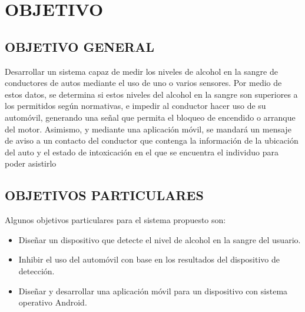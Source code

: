 \section{OBJETIVO}
\subsection{OBJETIVO GENERAL}
Desarrollar un sistema capaz de medir los niveles de alcohol en la sangre de conductores de autos mediante el uso de uno o varios sensores. Por medio de estos datos, se determina si estos niveles del alcohol en la sangre son superiores a los permitidos según normativas, e impedir al conductor hacer uso de su automóvil, generando una señal que permita el bloqueo de encendido o arranque del motor. Asimismo,  y mediante una aplicación móvil, se mandará un mensaje de aviso a un contacto del conductor que contenga la información de la ubicación del auto y el estado de intoxicación en el que se encuentra el individuo para poder asistirlo
\subsection{OBJETIVOS PARTICULARES}
Algunos objetivos particulares para el sistema propuesto son:
\begin{itemize}
    \item Diseñar un dispositivo que detecte el nivel de alcohol en la sangre del usuario.
    \item Inhibir el uso del automóvil con base en los resultados del dispositivo de detección.
    \item Diseñar y desarrollar una aplicación móvil para un dispositivo con sistema operativo Android.
\end{itemize}